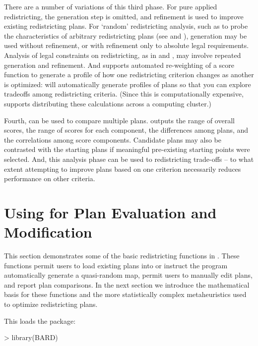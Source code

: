 \documentclass[article]{JSSstyle/jss}
\begin{document}
There are a number of variations of this third phase. For pure applied redistricting, the generation step is omitted, and refinement is used to improve existing redistricting plans. For `random' redistricting analysis, such as to probe the characteristics of arbitrary redistricting plans (see \citet{EngWild77,RosJohn81,Oloughlin82,Grofman82} and \citet{CirDarOro00}), generation may be used without refinement, or with refinement only to absolute legal requirements. Analysis of legal constraints on redistricting, as in \citet{Altman97} and \citet{RogersonYang99}, may involve repeated  generation and refinement. And  supports automated re-weighting of a score function to generate a profile of how one redistricting criterion changes as another is optimized:  will automatically generate profiles of plans so that you can explore tradeoffs among redistricting criteria. (Since this is computationally expensive,  supports distributing these calculations across a computing cluster.)

Fourth,  can be used to compare multiple plans.   outputs the range of overall scores, the range of scores for each component, the differences among plans, and the correlations among score components.   Candidate plans may also be contrasted with the starting plans if meaningful pre-existing starting points were selected.  And, this analysis phase can be used to redistricting trade-offs -- to what extent attempting to improve plans based on one criterion necessarily reduces performance on other criteria.

\section[Example: Using BARD for Plan Evaluation and Modification]{Using  for Plan Evaluation and Modification}

This section demonstrates some of the basic redistricting 
functions in . These functions permit users to load existing plans into  or instruct 
the program automatically generate a quasi-random map, permit users to manually edit plans, 
and report plan comparisons. In the next section we introduce the mathematical basis for these functions 
and the more statistically complex metaheuristics used to optimize redistricting plans.  

This loads the  package:

\begin{Schunk}
\begin{Sinput}
> library(BARD)
\end{Sinput}
\end{Schunk}
\end{document}
